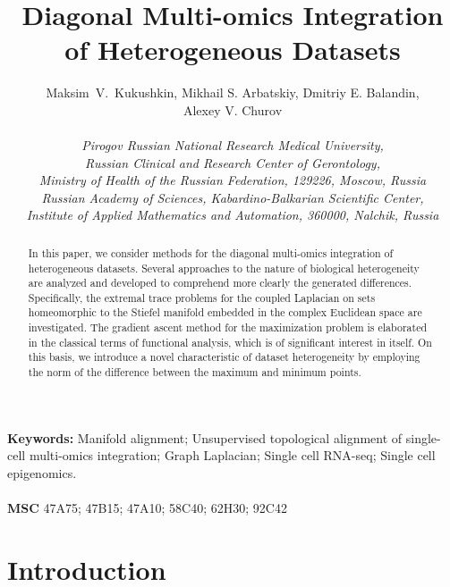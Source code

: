 \documentclass[a4paper,twoside,12pt]{article}
\title{  {\bf  Diagonal  Multi-omics  Integration  of Heterogeneous Datasets} }
\author{ Maksim \,V.~Kukushkin,  Mikhail S. Arbatskiy,  Dmitriy E. Balandin,\\ Alexey V. Churov   \\ \\
  \small  \textit{Pirogov Russian National Research Medical University,}\\
    \small  \textit{Russian Clinical and Research Center of Gerontology,}\\
    \small  \textit{ Ministry of Health of the Russian Federation,  129226, Moscow, Russia}\\
  \small\textit{Russian Academy of Sciences,  Kabardino-Balkarian Scientific Center,}\\
 \small\textit{Institute of Applied Mathematics and Automation, 360000,  Nalchik, Russia}\\}
\date{}
\begin{document}
\maketitle

\begin{abstract}









 In this paper, we consider methods for the diagonal multi-omics integration of heterogeneous datasets. Several approaches to the nature of biological heterogeneity are analyzed and developed to comprehend  more clearly the generated differences. Specifically, the extremal trace problems for the coupled Laplacian on sets homeomorphic to the Stiefel manifold embedded in the complex Euclidean space are investigated. The gradient ascent method for the maximization problem is elaborated in the classical terms of functional analysis, which is of significant interest in itself. On this basis, we introduce a novel characteristic of dataset heterogeneity by employing  the norm of the difference between the maximum and minimum points.






\end{abstract}
\begin{small}\textbf{Keywords:}
  Manifold alignment; Unsupervised topological alignment
of single-cell multi-omics integration; Graph Laplacian;     Single cell RNA-seq; Single cell epigenomics.   \\\\
{\textbf{MSC}  47A75; 47B15; 47A10; 58C40; 62H30; 92C42  }
\end{small}














\section{Introduction}
\end{document}
